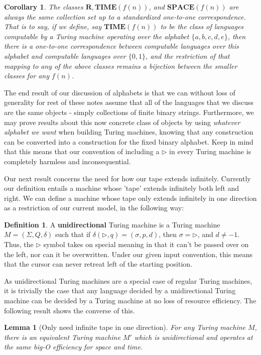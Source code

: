 \documentclass{article}
\theoremstyle{definition}
\newtheorem{definition}{Definition}[section]
\theoremstyle{plain}
\theoremstyle{theorem}
\newtheorem{lemma}{Lemma}[section]
\newtheorem{corollary}{Corollary}[section]
\begin{document}
\begin{corollary}
	The classes $\bm{R},\bm{TIME}(f(n))$, and $\bm{SPACE}(f(n))$ are always the same collection set up to a standardized one-to-one correspondence. That is to say, if we define, say $\bm{TIME}(f(n))$ to be the class of languages computable by a Turing machine operating over the alphabet $\{a,b,c,d,e\}$, then there is a one-to-one correspondence between computable languages over this alphabet and computable languages over $\{0,1\}$, and the restriction of that mapping to any of the above classes remains a bijection between the smaller classes for any $f(n)$. 
\end{corollary} 
The end result of our discussion of alphabets is that we can without loss of generality for rest of these notes assume that all of the languages that we discuss are the same objects - simply collections of finite binary strings. Furthermore, we may prove results about this now concrete class of objects by using \textit{whatever alphabet we want} when building Turing machines, knowing that any construction can be converted into a construction for the fixed binary alphabet. Keep in mind that this means that our convention of including a $\triangleright$ in every Turing machine is completely harmless and inconsequential.
\par  
Our next result concerns the need for how our tape extends infinitely. Currently our definition entails a machine whose 'tape' extends infinitely both left and right. We can define a machine whose tape only extends infinitely in one direction as a restriction of our current model, in the following way:
\begin{definition}
	A \textbf{unidirectional} Turing machine is a Turing machine $M = (\Sigma,Q,\delta)$ such that if $\delta(\triangleright,q) = (\sigma,p,d)$, then $\sigma = \triangleright$, and $d \neq -1$. Thus, the $\triangleright$ symbol takes on special meaning in that it can't be passed over on the left, nor can it be overwritten. Under our given input convention, this means that the cursor can never retreat left of the starting position.
\end{definition}
As unidirectional Turing machines are a special case of regular Turing machines, it is trivially the case that any language decided by a unidirectional Turing machine can be decided by a Turing machine at no loss of resource efficiency. The following result shows the converse of this.
\begin{lemma}[Only need infinite tape in one direction]
	For any Turing machine $M$, there is an equivalent Turing machine $M'$ which is unidirectional and operates at the same big-O efficiency for space and time.
\end{lemma}
\end{document}
